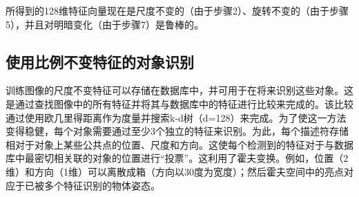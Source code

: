 
所得到的128维特征向量现在是尺度不变的（由于步骤2）、旋转不变的（由于步骤5），并且对明暗变化（由于步骤7）是鲁棒的。


\subsection{使用比例不变特征的对象识别}

训练图像的尺度不变特征可以存储在数据库中，并可用于在将来识别这些对象。这是通过查找图像中的所有特征并将其与数据库中的特征进行比较来完成的。该比较通过使用欧几里得距离作为度量并搜索k-d树（d=128）来完成。为了使这一方法变得稳健，每个对象需要通过至少3个独立的特征来识别。为此，每个描述符存储相对于对象上某些公共点的位置、尺度和方向。这使每个检测到的特征对于与数据库中最密切相关联的对象的位置进行“投票”。这利用了霍夫变换。例如，位置（2维）和方向（1维）可以离散成箱（方向以30度为宽度）；然后霍夫空间中的亮点对应于已被多个特征识别的物体姿态。

